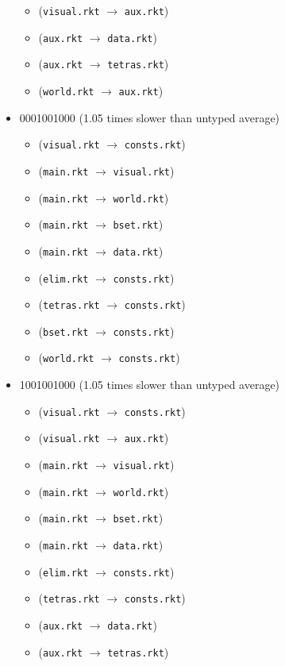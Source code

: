 \documentclass{article}
\newcommand{\mono}[1]{\texttt{#1}}
\begin{document}
\begin{itemize}
\begin{itemize}
  \item (\mono{visual.rkt} $\rightarrow$ \mono{aux.rkt})
  \item (\mono{aux.rkt} $\rightarrow$ \mono{data.rkt})
  \item (\mono{aux.rkt} $\rightarrow$ \mono{tetras.rkt})
  \item (\mono{world.rkt} $\rightarrow$ \mono{aux.rkt})
  \end{itemize}
\item 0001001000 (1.05 times slower than untyped average)
  \begin{itemize}
  \item (\mono{visual.rkt} $\rightarrow$ \mono{consts.rkt})
  \item (\mono{main.rkt} $\rightarrow$ \mono{visual.rkt})
  \item (\mono{main.rkt} $\rightarrow$ \mono{world.rkt})
  \item (\mono{main.rkt} $\rightarrow$ \mono{bset.rkt})
  \item (\mono{main.rkt} $\rightarrow$ \mono{data.rkt})
  \item (\mono{elim.rkt} $\rightarrow$ \mono{consts.rkt})
  \item (\mono{tetras.rkt} $\rightarrow$ \mono{consts.rkt})
  \item (\mono{bset.rkt} $\rightarrow$ \mono{consts.rkt})
  \item (\mono{world.rkt} $\rightarrow$ \mono{consts.rkt})
  \end{itemize}
\item 1001001000 (1.05 times slower than untyped average)
  \begin{itemize}
  \item (\mono{visual.rkt} $\rightarrow$ \mono{consts.rkt})
  \item (\mono{visual.rkt} $\rightarrow$ \mono{aux.rkt})
  \item (\mono{main.rkt} $\rightarrow$ \mono{visual.rkt})
  \item (\mono{main.rkt} $\rightarrow$ \mono{world.rkt})
  \item (\mono{main.rkt} $\rightarrow$ \mono{bset.rkt})
  \item (\mono{main.rkt} $\rightarrow$ \mono{data.rkt})
  \item (\mono{elim.rkt} $\rightarrow$ \mono{consts.rkt})
  \item (\mono{tetras.rkt} $\rightarrow$ \mono{consts.rkt})
  \item (\mono{aux.rkt} $\rightarrow$ \mono{data.rkt})
  \item (\mono{aux.rkt} $\rightarrow$ \mono{tetras.rkt})

\end{itemize}
\end{itemize}
\end{document}
